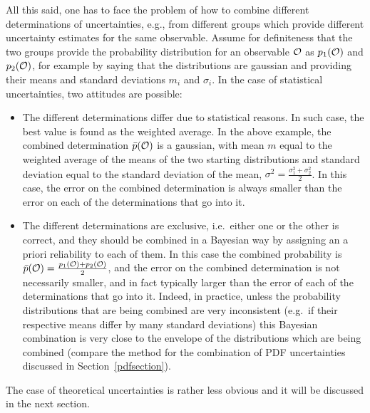 All this said, one has to face the problem of how to combine different
determinations of uncertainties, e.g., from different groups which
provide different uncertainty estimates for the same
observable. Assume for definiteness that
the two groups provide the probability
distribution  
for an observable ${\cal O}$ as $p_1({\cal O})$ and $p_2({\cal O})$,
for example by saying that the distributions are gaussian and
providing their means and standard deviations $m_i$ and $\sigma_i$.
In the case of statistical uncertainties, two attitudes are possible:
\begin{itemize}
\item The different determinations differ due to  statistical
  reasons.
In such case, the best value is found as the weighted
  average. In the above example, the combined determination $\bar p({\cal O})$
is a gaussian, with mean $m$ equal to the weighted average of the means
of the two starting distributions and standard deviation equal to the 
standard deviation of the mean,
$\sigma^2=\frac{\sigma_1^2+\sigma_2^2}{2}$. In this case, the error on
the combined determination is always smaller than the error on each of
the determinations that go into it.
\item The different determinations are exclusive, i.e.\ either one 
  or the other is correct, and they should be
  combined in a Bayesian way by assigning an a priori reliability to
  each of them. In this case  the combined
  probability is 
$\bar p({\cal O})=\frac{p_1({\cal O})+p_2({\cal O})}{2}$, and
  the error on
the combined determination
is not necessarily smaller, and in fact typically larger
  than the error of each of the determinations that go into it.
Indeed,  in practice, unless the
  probability distributions that are being combined are very
  inconsistent (e.g.\ if their respective means differ by many standard
  deviations) this Bayesian combination is very close to the envelope
  of the distributions which are being combined (compare the method
  for the combination of PDF
  uncertainties discussed in Section~\ref{pdfsection}).
\end{itemize}
The case of theoretical uncertainties is rather less obvious and it
will be discussed in the next section.
